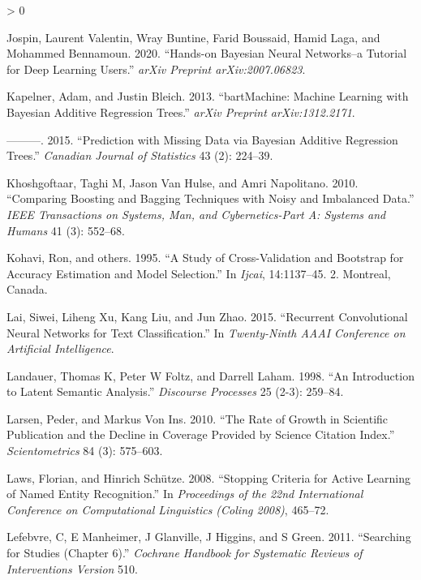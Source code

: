\documentclass{article}
\newlength{\cslhangindent}
\newenvironment{CSLReferences}[2] %
 {%
  \setlength{\parindent}{0pt}
  \ifodd #1 \everypar{\setlength{\hangindent}{\cslhangindent}}\ignorespaces\fi
  \ifnum #2 > 0
  \setlength{\parskip}{#2\baselineskip}
  \fi
 }%
 {}
\begin{document}
\begin{CSLReferences}{1}{0}
\leavevmode\hypertarget{ref-jospin2020hands}{}%
Jospin, Laurent Valentin, Wray Buntine, Farid Boussaid, Hamid Laga, and
Mohammed Bennamoun. 2020. {``Hands-on Bayesian Neural Networks--a
Tutorial for Deep Learning Users.''} \emph{arXiv Preprint
arXiv:2007.06823}.

\leavevmode\hypertarget{ref-kapelner2013bartmachine}{}%
Kapelner, Adam, and Justin Bleich. 2013. {``bartMachine: Machine
Learning with Bayesian Additive Regression Trees.''} \emph{arXiv
Preprint arXiv:1312.2171}.

\leavevmode\hypertarget{ref-kapelner2015prediction}{}%
---------. 2015. {``Prediction with Missing Data via Bayesian Additive
Regression Trees.''} \emph{Canadian Journal of Statistics} 43 (2):
224--39.

\leavevmode\hypertarget{ref-khoshgoftaar2010comparing}{}%
Khoshgoftaar, Taghi M, Jason Van Hulse, and Amri Napolitano. 2010.
{``Comparing Boosting and Bagging Techniques with Noisy and Imbalanced
Data.''} \emph{IEEE Transactions on Systems, Man, and Cybernetics-Part
A: Systems and Humans} 41 (3): 552--68.

\leavevmode\hypertarget{ref-kohavi1995study}{}%
Kohavi, Ron, and others. 1995. {``A Study of Cross-Validation and
Bootstrap for Accuracy Estimation and Model Selection.''} In
\emph{Ijcai}, 14:1137--45. 2. Montreal, Canada.

\leavevmode\hypertarget{ref-lai2015recurrent}{}%
Lai, Siwei, Liheng Xu, Kang Liu, and Jun Zhao. 2015. {``Recurrent
Convolutional Neural Networks for Text Classification.''} In
\emph{Twenty-Ninth AAAI Conference on Artificial Intelligence}.

\leavevmode\hypertarget{ref-landauer1998introduction}{}%
Landauer, Thomas K, Peter W Foltz, and Darrell Laham. 1998. {``An
Introduction to Latent Semantic Analysis.''} \emph{Discourse Processes}
25 (2-3): 259--84.

\leavevmode\hypertarget{ref-larsen2010rate}{}%
Larsen, Peder, and Markus Von Ins. 2010. {``The Rate of Growth in
Scientific Publication and the Decline in Coverage Provided by Science
Citation Index.''} \emph{Scientometrics} 84 (3): 575--603.

\leavevmode\hypertarget{ref-laws2008stopping}{}%
Laws, Florian, and Hinrich Schütze. 2008. {``Stopping Criteria for
Active Learning of Named Entity Recognition.''} In \emph{Proceedings of
the 22nd International Conference on Computational Linguistics (Coling
2008)}, 465--72.

\leavevmode\hypertarget{ref-lefebvre2011searching}{}%
Lefebvre, C, E Manheimer, J Glanville, J Higgins, and S Green. 2011.
{``Searching for Studies (Chapter 6).''} \emph{Cochrane Handbook for
Systematic Reviews of Interventions Version} 510.


\end{CSLReferences}
\end{document}
